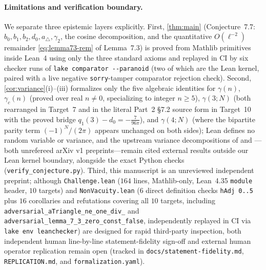 \documentclass[11pt,a4paper]{article}
\numberwithin{equation}{section}
\theoremstyle{plain}
\theoremstyle{definition}
\theoremstyle{remark}
\newcommand{\tri}{a_{\triangle}}
\newcommand{\code}[1]{\texttt{\small #1}}
\begin{document}
\paragraph{Limitations and verification boundary.}
We separate three epistemic layers explicitly. First, \cref{thm:main} (Conjecture~7.7: $b_0,b_1,b_2,d_0,\tri,\gamma_2$, the cosine decomposition, and the quantitative $O(\ell^{-2})$ remainder \eqref{eq:lemma73-rem} of Lemma~7.3) is proved from Mathlib primitives inside Lean~4 using only the three standard axioms and replayed in CI by six checker runs of \code{lake comparator {-}{-}paranoid} (two of which are the Lean kernel, paired with a live negative \code{sorry}-tamper comparator rejection check). Second, \cref{cor:variance}(i)--(iii) formalizes only the five algebraic identities for $\gamma(n)$, $\gamma_c(n)$ (proved over real $n\ne 0$, specializing to integer $n\ge 5$), $\gamma(3;N)$ (both rearranged in Target~7 and in the literal Part~2 \S7.2 source form in Target~10 with the proved bridge $q_1(3)-d_0=-\frac{7}{96\pi}$), and $\gamma(4;N)$ (where the bipartite parity term $(-1)^N/(2\pi)$ appears unchanged on both sides); Lean defines no random variable or variance, and the upstream variance decompositions of \cite[Theorem~7.6, \S7.2, \S8]{banic_elezovic_p2} and \cite[Theorem~3.10]{banic_elezovic_p5}---both unrefereed arXiv v1 preprints---remain cited external results outside our Lean kernel boundary, alongside the exact Python checks (\code{verify\_conjecture.py}). Third, this manuscript is an unreviewed independent preprint; although \code{Challenge.lean} ($164$ lines, Mathlib-only, Lean~4.35 \code{module} header, $10$ targets) and \code{NonVacuity.lean} ($6$ direct definition checks \code{hAdj 0..5} plus $16$ corollaries and refutations covering all $10$ targets, including \code{adversarial\_\allowbreak aTriangle\_\allowbreak ne\_\allowbreak one\_\allowbreak div\_\allowbreak 32} and \code{adversarial\_\allowbreak lemma\_7\_3\_\allowbreak zero\_\allowbreak const\_\allowbreak false}, independently replayed in CI via \code{lake env leanchecker}) are designed for rapid third-party inspection, both independent human line-by-line statement-fidelity sign-off and external human operator replication remain open (tracked in \nolinkurl{docs/statement-fidelity.md}, \code{REPLICATION.md}, and \code{formalization.yaml}).
\end{document}
